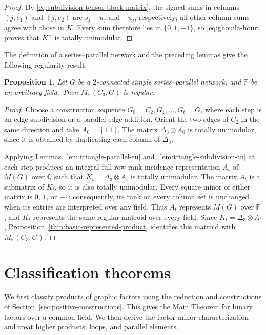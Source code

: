 \documentclass[12pt,a4paper]{article}
\numberwithin{equation}{section}
\newcommand{\F}{\mathbb F}
\newcommand{\QQ}{\mathbb Q}
\newcommand{\mainthm}{\hyperref[thm:regular-two-factor]{Main Theorem}}
\newtheorem{proposition}[proposition]{Proposition}
\theoremstyle{definition}
\theoremstyle{remark}
\begin{document}
\begin{proof}
By \eqref{eq:subdivision-tensor-block-matrix}, the signed sums
in columns \((j,e_1)\) and \((j,e_2)\) are \(s_j+u_j\) and
\(-u_j\), respectively; all other column sums agree with those
in \(K\).  Every sum therefore lies in \(\{0,1,-1\}\), so
\eqref{eq:ghouila-houri} proves that \(K^+\) is totally unimodular.
\end{proof}

The definition of a series--parallel network and the preceding
lemmas give the following regularity result.
\begin{proposition}
\label{prop:triangle-series-parallel}
Let \(G\) be a \(2\)-connected simple series--parallel network, and \(\F\) be an arbitrary field.  Then \(M_{\F}(C_3,G)\) is regular.
\end{proposition}
\begin{proof}
Choose a construction sequence \(G_0=C_2,G_1,\ldots,G_t=G\),
where each step is an edge subdivision or a parallel-edge addition.
Orient the two edges of \(C_2\) in the same direction and take
\(A_0=[1\ 1]\).  The matrix \(\Delta_3\otimes A_0\) is totally
unimodular, since it is obtained by duplicating each column of
\(\Delta_3\).

Applying Lemmas~\ref{lem:triangle-parallel-tu}
and~\ref{lem:triangle-subdivision-tu} at each step produces an
integral full row rank incidence representation \(A_t\) of
\(M(G)\) over \(\QQ\) such that
\(K_t=\Delta_3\otimes A_t\) is totally unimodular.
The matrix \(A_t\) is a submatrix of \(K_t\), so it is also
totally unimodular.  Every square minor of either matrix is
\(0\), \(1\), or \(-1\); consequently, its rank on every
column set is unchanged when its entries are interpreted over any
field.  Thus \(A_t\) represents \(M(G)\) over \(\F\), and
\(K_t\) represents the same regular matroid over every field.
Since \(K_t=\Delta_3\otimes A_t\),
Proposition~\ref{thm:basic-represented-product} identifies this
matroid with \(M_{\F}(C_3,G)\).
\end{proof}


\section{Classification theorems}
\label{sec:regular-matroids}
We first classify products of graphic factors using the reduction
and constructions of Section~\ref{sec:positive-constructions}.
This gives the \mainthm{} for binary factors over a common field.  We then derive
the factor-minor characterization and treat higher products,
loops, and parallel elements.
\end{document}
